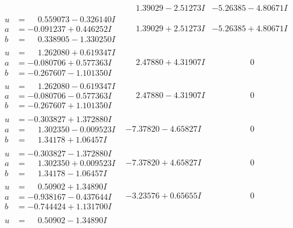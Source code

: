 \documentclass[1p]{elsarticle_modified}
\theoremstyle{definition}
\begin{document}
$$\begin{array}{c|c|c}
 & \phantom{-}1.39029 - 2.51273 I & -5.26385 - 4.80671 I \\ \hline\begin{aligned}
u &= \phantom{-}0.559073 - 0.326140 I \\
a &= -0.091237 + 0.446252 I \\
b &= \phantom{-}0.338905 - 1.330250 I\end{aligned}
 & \phantom{-}1.39029 + 2.51273 I & -5.26385 + 4.80671 I \\ \hline\begin{aligned}
u &= \phantom{-}1.262080 + 0.619347 I \\
a &= -0.080706 + 0.577363 I \\
b &= -0.267607 - 1.101350 I\end{aligned}
 & \phantom{-}2.47880 + 4.31907 I & \phantom{-0.000000 } 0 \\ \hline\begin{aligned}
u &= \phantom{-}1.262080 - 0.619347 I \\
a &= -0.080706 - 0.577363 I \\
b &= -0.267607 + 1.101350 I\end{aligned}
 & \phantom{-}2.47880 - 4.31907 I & \phantom{-0.000000 } 0 \\ \hline\begin{aligned}
u &= -0.303827 + 1.372880 I \\
a &= \phantom{-}1.302350 - 0.009523 I \\
b &= \phantom{-}1.34178 + 1.06457 I\end{aligned}
 & -7.37820 - 4.65827 I & \phantom{-0.000000 } 0 \\ \hline\begin{aligned}
u &= -0.303827 - 1.372880 I \\
a &= \phantom{-}1.302350 + 0.009523 I \\
b &= \phantom{-}1.34178 - 1.06457 I\end{aligned}
 & -7.37820 + 4.65827 I & \phantom{-0.000000 } 0 \\ \hline\begin{aligned}
u &= \phantom{-}0.50902 + 1.34890 I \\
a &= -0.938167 - 0.437644 I \\
b &= -0.744424 + 1.131700 I\end{aligned}
 & -3.23576 + 0.65655 I & \phantom{-0.000000 } 0 \\ \hline\begin{aligned}
u &= \phantom{-}0.50902 - 1.34890 I \\

\end{aligned}
\end{array}$$
\end{document}
